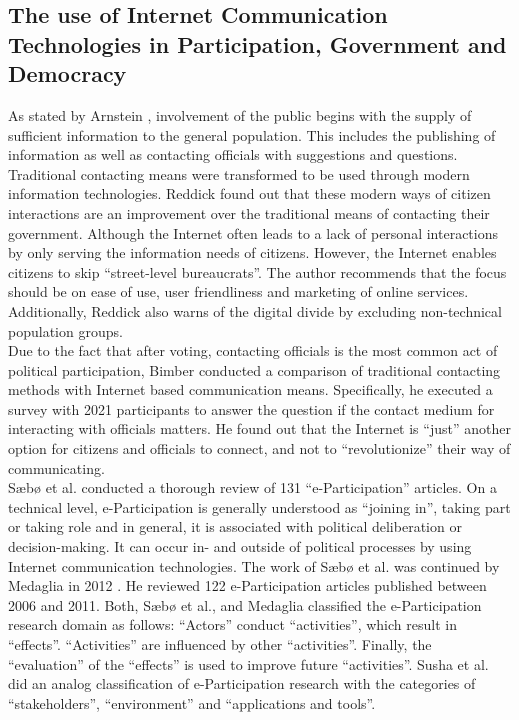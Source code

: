 \subsection{The use of Internet Communication Technologies in Participation, Government and Democracy}
As stated by Arnstein \cite{Arnstein1969_citizen_participation}, involvement of the public begins with the supply of sufficient information to the general population. This includes the publishing of information as well as contacting officials with suggestions and questions. Traditional contacting means were transformed to be used through modern information technologies. Reddick \cite{Reddick2005_Citizen_interaction_with_egovernment} found out that these modern ways of citizen interactions are an improvement over the traditional means of contacting their government. Although the Internet often leads to a lack of personal interactions by only serving the information needs of citizens. However, the Internet enables citizens to skip ``street-level bureaucrats''. The author recommends that the focus should be on ease of use, user friendliness and marketing of online services. Additionally, Reddick also warns of the digital divide by excluding non-technical population groups.\\
Due to the fact that after voting, contacting officials is the most common act of political participation, Bimber \cite{Bimber1999_Citizen_communication_with_government} conducted a comparison of traditional contacting methods with Internet based communication means. Specifically, he executed a survey with 2021 participants to answer the question if the contact medium for interacting with officials matters. He found out that the Internet is ``just'' another option for citizens and officials to connect, and not to ``revolutionize'' their way of communicating.\\
S{\ae}b{\o} et al. \cite{Saebo_eParticipation} conducted a thorough review of 131 ``e-Participation'' articles. On a technical level, e-Participation is generally understood as ``joining in'', taking part or taking role and in general, it is associated with political deliberation or decision-making. It can occur in- and outside of political processes by using Internet communication technologies. The work of S{\ae}b{\o} et al. was continued by Medaglia in 2012 \cite{Medaglia2012_eParticipation}. He reviewed 122 e-Participation articles published between 2006 and 2011. Both, S{\ae}b{\o} et al., and Medaglia classified the e-Participation research domain as follows: ``Actors'' conduct ``activities'', which result in ``effects''. ``Activities'' are influenced by other ``activities''. Finally, the ``evaluation'' of the ``effects'' is used to improve future ``activities''. Susha et al. \cite{Susha2012_eParticipation} did an analog classification of e-Participation research with the categories of ``stakeholders'', ``environment'' and ``applications and tools''.\\
